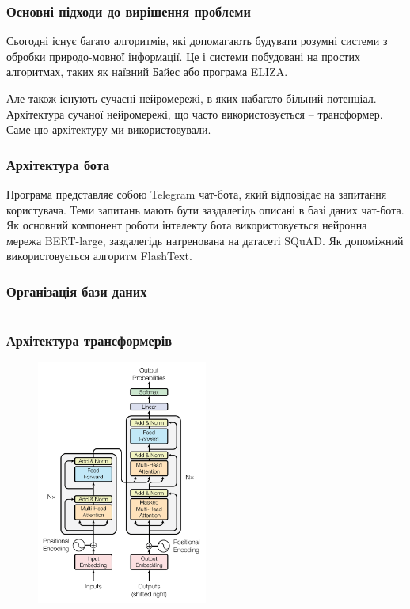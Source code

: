 \documentclass{beamer}
\begin{document}
\begin{frame}
    \frametitle{Основні підходи до вирішення проблеми}
    Сьогодні існує багато алгоритмів, які допомагають будувати розумні системи з обробки природо-мовної інформації. Це і системи побудовані на простих алгоритмах, таких як наївний Байес або програма ELIZA.
    
    Але також існують сучасні нейромережі, в яких набагато більний потенціал. Архітектура сучаної нейромережі, що часто використовується -- трансформер. Саме цю архітектуру ми використовували.
\end{frame}

\begin{frame}
    \frametitle{Архітектура бота}
    Програма представляє собою Telegram чат-бота, який відповідає на запитання користувача. Теми запитань мають бути заздалегідь описані в базі даних чат-бота. Як основний компонент роботи інтелекту бота використовується нейронна мережа BERT-large, заздалегідь натренована на датасеті SQuAD. Як допоміжний використовується алгоритм FlashText.
\end{frame}

\begin{frame}
    \frametitle{Організація бази даних}
    \inputminted[breaklines,linenos=true]{yaml}{sample.yaml}
\end{frame}

\begin{frame}
    \frametitle{Архітектура трансформерів}
    \begin{figure}[H]
        \centering
        \includegraphics[width=0.5\textwidth]{transformer.png}
    \end{figure}
\end{frame}
\end{document}
